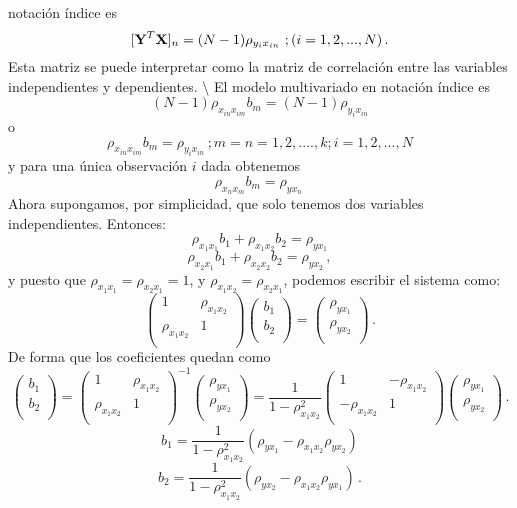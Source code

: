 \documentclass[
]{agujournal2019}
\begin{document}
notación índice es
\[[{\textbf Y}^T{\textbf X}]_n=(N-1)\rho_{y_i x_{in}}\,\,;(i=1,2,...,N)\,.\]
Esta matriz se puede interpretar como la matriz de correlación entre las
variables independientes y dependientes. \textbackslash{} \noindent El
modelo multivariado en notación índice es
\[(N-1)\rho_{x_{in} x_{im}}b_m=(N-1)\rho_{y_i x_{in}}\] o
\[\rho_{x_{in} x_{im}}b_m=\rho_{y_i x_{in}}\,;m=n=1,2,....,k; i=1,2,...,N\]
y para una única observación \(i\) dada obtenemos
\[\rho_{x_{n} x_{m}}b_m=\rho_{y x_{n}}\,\] Ahora supongamos, por
simplicidad, que solo tenemos dos variables independientes. Entonces:
\[\rho_{x_{1} x_{1}}b_1+\rho_{x_{1} x_{2}}b_2=\rho_{y x_{1}}\]
\[\rho_{x_{2} x_{1}}b_1+\rho_{x_{2} x_{2}}b_2=\rho_{y x_{2}}\,,\] y
puesto que \(\rho_{x_{1} x_{1}}=\rho_{x_{2} x_{1}}=1\), y
\(\rho_{x_{1} x_{2}}=\rho_{x_{2} x_{1}}\), podemos escribir el sistema
como: \[\left(\begin{array}{cc}
  1 & \rho_{x_{1} x_{2}} \\
  \rho_{x_{1} x_{2}} & 1 \\
        \end{array}\right)
  \left(\begin{array}{c}
  b_1 \\
  b_2 \\
        \end{array}\right)=
     \left(\begin{array}{c}
  \rho_{y x_{1}} \\
  \rho_{y x_{2}} \\
        \end{array}\right)\,.\] De forma que los coeficientes quedan
como \[\left(\begin{array}{c}
  b_1 \\
  b_2 \\
        \end{array}\right)=\left(\begin{array}{cc}
  1 & \rho_{x_{1} x_{2}} \\
  \rho_{x_{1} x_{2}} & 1 \\
        \end{array}\right)^{-1}
     \left(\begin{array}{c}
  \rho_{y x_{1}} \\
  \rho_{y x_{2}} \\
        \end{array}\right)=\frac{1}{1-\rho^2_{x_{1} x_{2}}}
    \left(\begin{array}{cc}
  1 & -\rho_{x_{1} x_{2}} \\
  -\rho_{x_{1} x_{2}} & 1 \\
        \end{array}\right)\left(\begin{array}{c}
  \rho_{y x_{1}} \\
  \rho_{y x_{2}} \\
        \end{array}\right)\,.\]
\[b_1=\frac{1}{1-\rho^2_{x_{1} x_{2}}}({\rho_{y x_{1}} - \rho_{x_{1} x_{2}} \rho_{y x_{2}}})\]
\[b_2=\frac{1}{1-\rho^2_{x_{1} x_{2}}}({\rho_{y x_{2}} - \rho_{x_{1} x_{2}} \rho_{y x_{1}}})\,.\]
\end{document}
